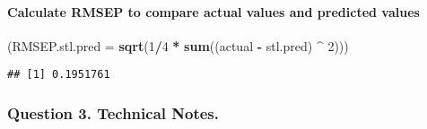 \documentclass[]{article}
\newenvironment{Shaded}{\begin{snugshade}}{\end{snugshade}}
\newcommand{\DataTypeTok}[1]{\textcolor[rgb]{0.13,0.29,0.53}{#1}}
\newcommand{\DecValTok}[1]{\textcolor[rgb]{0.00,0.00,0.81}{#1}}
\newcommand{\KeywordTok}[1]{\textcolor[rgb]{0.13,0.29,0.53}{\textbf{#1}}}
\newcommand{\NormalTok}[1]{#1}
\newcommand{\OperatorTok}[1]{\textcolor[rgb]{0.81,0.36,0.00}{\textbf{#1}}}
\newcommand{\StringTok}[1]{\textcolor[rgb]{0.31,0.60,0.02}{#1}}
\let\oldparagraph\paragraph
\renewcommand{\paragraph}[1]{\oldparagraph{#1}\mbox{}}
\begin{document}
\begin{Shaded}
\end{Shaded}

\hypertarget{calculate-rmsep-to-compare-actual-values-and-predicted-values}{%
\paragraph{Calculate RMSEP to compare actual values and predicted
values}\label{calculate-rmsep-to-compare-actual-values-and-predicted-values}}

\begin{Shaded}
\begin{Highlighting}[]
\NormalTok{(}\DataTypeTok{RMSEP.stl.pred =} \KeywordTok{sqrt}\NormalTok{(}\DecValTok{1}\OperatorTok{/}\DecValTok{4} \OperatorTok{*}\StringTok{ }\KeywordTok{sum}\NormalTok{((actual }\OperatorTok{-}\StringTok{ }\NormalTok{stl.pred) }\OperatorTok{^}\StringTok{ }\DecValTok{2}\NormalTok{)))}
\end{Highlighting}
\end{Shaded}

\begin{verbatim}
## [1] 0.1951761
\end{verbatim}

\hypertarget{question-3.-technical-notes.}{%
\subsubsection{Question 3. Technical
Notes.}\label{question-3.-technical-notes.}}
\end{document}
